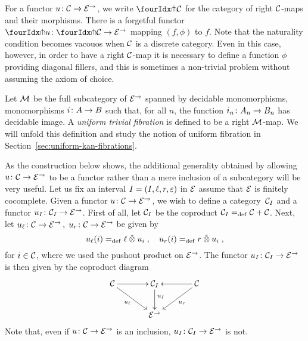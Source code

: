 \documentclass[reqno,10pt,a4paper,oneside]{amsart}
\begin{document}
For a functor $u \co \cal{C} \to \catE^\to$, we write $\liftr{\cal{C}}$ for the category  of 
right $\cal{C}$-maps and their morphisms. There is a forgetful functor~$\liftr{u} \co \liftr{\cal{C}} \to \catE^\to$
mapping $(f, \phi)$ to $f$. Note that the naturality condition becomes vacouos when $\cal{C}$ is a discrete category. Even in this case, however, in order to have a right $\cal{C}$-map it is necessary to define a function $\phi$ providing 
diagonal fillers, and this is sometimes a non-trivial problem without assuming the axiom of choice.



\begin{example}  \label{exa-triv-kan-fib}
Let $\cal{M}$ be the full subcategory of $\cal{E}^\to$ spanned by decidable mo\-no\-mor\-phisms, \ie
mo\-no\-mor\-phisms $i \co A \to B$ such that, for all $n$, the function $i_n \co A_n \to B_n$ has decidable
image. A \emph{uniform trivial fibration} is defined to be a right $\cal{M}$-map. We will unfold this
definition and study the notion of uniform  fibration in Section~\ref{sec:uniform-kan-fibrations}.
\end{example}

\medskip


As the construction below shows, the additional generality obtained by allowing $u \co \cal{C} \to \catE^\to$ to be a functor rather than a mere inclusion of a  subcategory will be very useful.  Let us fix an interval $\interval = (\interval,  \intervall, \intervalr, \varepsilon)$ in $\catE$ assume that $\catE$ is finitely cocomplete. Given a functor $u \co \cal{C} \to \catE^\to$, we wish to define a category~$\cal{C}_\interval$ and a functor $u_\interval \co \cal{C}_\interval \to \catE^\to$. First of all, let $\cal{C}_\interval$ be the coproduct $\cal{C}_\interval  \defeq \cal{C} + \cal{C}$.
 Next, let $u_{\intervall} \co \cal{C} \to \catE^\to \, , \; u_{\intervalr} \co \cal{C} \to \catE^\to$ be given by
 \[
u_{\intervall}(i) \defeq  \intervall \hatotimes u_i \; , \quad
u_{\intervalr}(i) \defeq  \intervalr \hatotimes u_i \; , 
\]
for $i \in \cal{C}$, where we used the pushout product on $\catE^\to$. The functor $u_\interval \co \cal{C}_\interval \to \catE^\to$ is then given by the coproduct diagram
\begin{equation}
\label{equ:u-interval}
\vcenter{\hbox{\xymatrix@C=1.2cm{
\cal{C} \ar[r] \ar[dr]_-{u_\intervall} & \cal{C}_\interval \ar[d]^(.4){u_\interval} & \cal{C} \ar[dl]^-{u_\intervalr} \ar[l] \\ 
 & \catE^\to }}}
\end{equation}
Note that, even if $u \co \cal{C} \to \catE^\to$ is an inclusion, $u_\interval \co \cal{C}_\interval \to \catE^\to$ is not.
\end{document}
